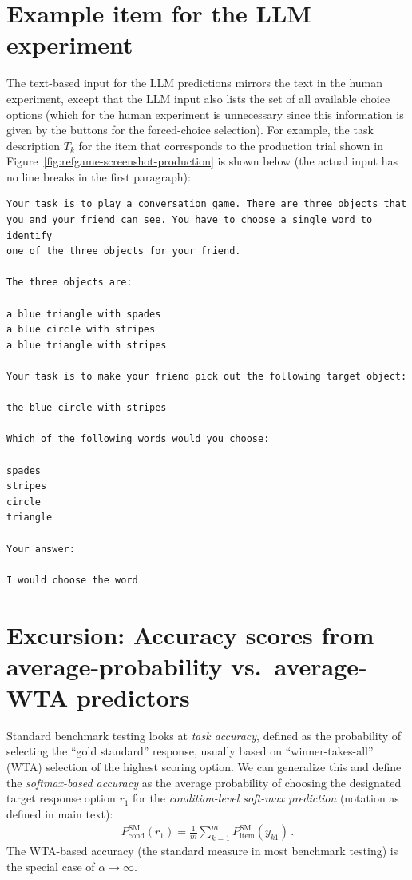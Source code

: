 \documentclass[fleqn]{article}
\begin{document}
\section{Example item for the LLM experiment}
\label{sec:examples-items-llm}

The text-based input for the LLM predictions mirrors the text in the human experiment, except that the LLM input also lists the set of all available choice options (which for the human experiment is unnecessary since this information is given by the buttons for the forced-choice selection).
For example, the task description $T_{k}$ for the item that corresponds to the production trial shown in Figure~\ref{fig:refgame-screenshot-production} is shown below (the actual input has no line breaks in the first paragraph):

\begin{verbatim}
Your task is to play a conversation game. There are three objects that
you and your friend can see. You have to choose a single word to identify
one of the three objects for your friend.

The three objects are:

a blue triangle with spades
a blue circle with stripes
a blue triangle with stripes

Your task is to make your friend pick out the following target object:

the blue circle with stripes

Which of the following words would you choose:

spades
stripes
circle
triangle

Your answer:

I would choose the word
\end{verbatim}

\section{Excursion: Accuracy scores from average-probability vs.~average-WTA predictors}
\label{sec:aver-prob-vs}

Standard benchmark testing looks at \emph{task accuracy}, defined as the probability of selecting the ``gold standard'' response, usually based on ``winner-takes-all'' (WTA) selection of the highest scoring option.
We can generalize this and define the \emph{softmax-based accuracy} as the average probability of choosing the designated target response option $r_{1}$ for the \emph{condition-level soft-max prediction} (notation as defined in main text):
\begin{align*}
  P_{\text{cond}}^{\text{SM}}\left(r_{1} \right) = \frac{1}{m} \sum_{k = 1}^{m} P_{\text{item}}^{\text{SM}} \left(y_{k1} \right)\,.
\end{align*}
The WTA-based accuracy (the standard measure in most benchmark testing) is the special case of $\alpha \rightarrow\infty$.
\end{document}
